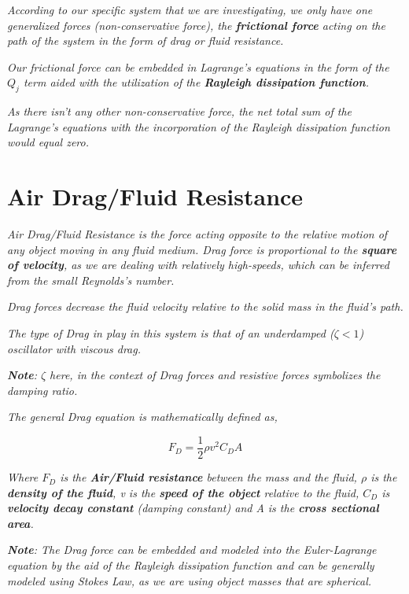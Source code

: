     \textit{According to our specific system that we are investigating, we only have one generalized forces (non-conservative force), the \textbf{frictional force} acting on the path of the system in the form of drag or fluid resistance.}
        
    \textit{Our frictional force can be embedded in Lagrange's equations in the form of the $Q_j$ term aided with the utilization of the \textbf{Rayleigh dissipation function}.}
        
    \textit{As there isn't any other non-conservative force, the net total sum of the Lagrange's equations with the incorporation of the Rayleigh dissipation function would equal zero.}
        
\section{{Air Drag/Fluid Resistance}}
        
    \textit{Air Drag/Fluid Resistance is the force acting opposite to the relative motion of any object moving in any fluid medium. Drag force is proportional to the \textbf{square of velocity}, as we are dealing with relatively high-speeds, which can be inferred from the small Reynolds's number.}
            
    \textit{Drag forces decrease the fluid velocity relative to the solid mass in the fluid's path.}
            
    \textit{The type of Drag in play in this system is that of an underdamped ($\zeta < 1$) oscillator with viscous drag.}
            
    \textit{\textbf{Note}: $\zeta$ here, in the context of Drag forces and resistive forces symbolizes the damping ratio.}
            
    \textit{The general Drag equation is mathematically defined as,}
            
        $$F_D = \frac{1}{2}\rho v^2C_DA$$
           
    \textit{Where $F_D$ is the \textbf{Air/Fluid resistance} between the mass and the fluid, $\rho$ is the \textbf{density of the fluid}, v is the \textbf{speed of the object} relative to the fluid, $C_D$ is \textbf{velocity decay constant} (damping constant) and A is the \textbf{cross sectional area}.}
            
    \textit{\textbf{Note}: The Drag force can be embedded and modeled into the Euler-Lagrange equation by the aid of the Rayleigh dissipation function and can be generally modeled using Stokes Law, as we are using object masses that are spherical.}
            
